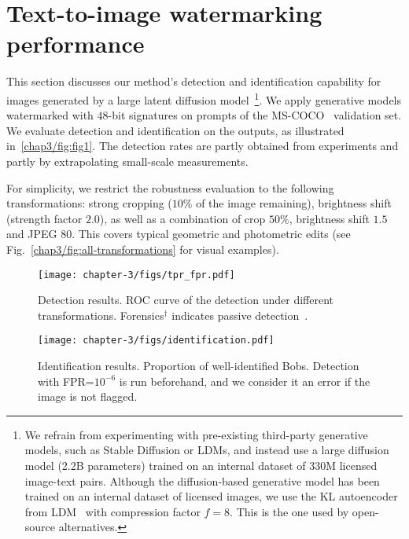 

\section{Text-to-image watermarking performance }\label{chap3/sec:application}
This section discusses our method's detection and identification capability for images generated by a large latent diffusion model~\citep{rombach2022high}\footnote{
    We refrain from experimenting with pre-existing third-party generative models, such as Stable Diffusion or LDMs, and instead use a large diffusion model (2.2B parameters) trained on an internal dataset of 330M licensed image-text pairs.
    Although the diffusion-based generative model has been trained on an internal dataset of licensed images, we use the KL autoencoder from LDM~\citep{rombach2022high} with compression factor $f=8$.
    This is the one used by open-source alternatives.
}.
We apply generative models watermarked with $48$-bit signatures on prompts of the MS-COCO~\citep{lin2014microsoft} validation set.
We evaluate detection and identification on the outputs, as illustrated in~\autoref{chap3/fig:fig1}.
The detection rates are partly obtained from experiments and partly by extrapolating small-scale measurements.

For simplicity, we restrict the robustness evaluation to the following transformations:
strong cropping ($10\%$ of the image remaining), 
brightness shift (strength factor $2.0$), 
as well as a combination of crop $50\%$, brightness shift $1.5$ and JPEG $80$. 
This covers typical geometric and photometric edits (see Fig.~\ref{chap3/fig:all-transformations} for visual examples).




\begin{figure}[b!]
    \begin{minipage}{0.47\textwidth}
        \centering
        \texttt{[image: chapter-3/figs/tpr\_fpr.pdf]}
        \caption{
            Detection results. \Gls*{ROC} curve of the detection under different transformations.
            Forensics$^\dagger$ indicates passive detection~\citep{corvi2022detection}.
        }\label{chap3/fig:tpr-fpr}
    \end{minipage}\hfill
    \begin{minipage}{0.47\textwidth}
        \centering
        \texttt{[image: chapter-3/figs/identification.pdf]}
        \caption{
            Identification results. 
            Proportion of well-identified Bobs.
            Detection with FPR=$10^{-6}$ is run beforehand, and we consider it an error if the image is not flagged.
        }\label{chap3/fig:identification}
    \end{minipage}
\end{figure}




